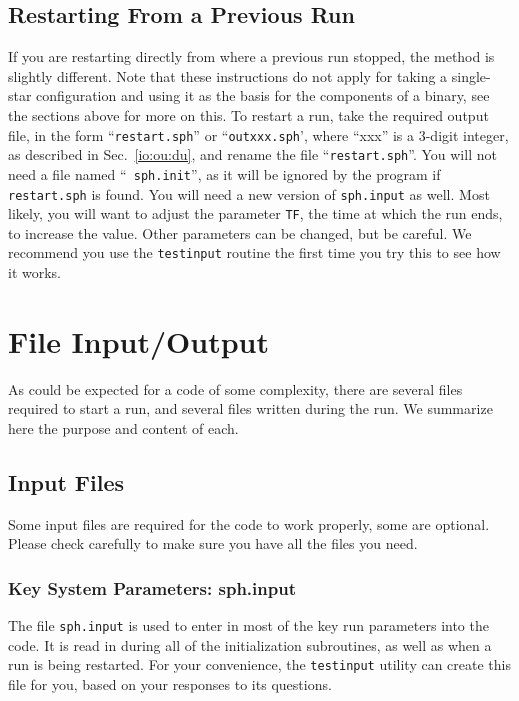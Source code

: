 \subsection{Restarting From a Previous Run}\label{in:re}
If you are restarting directly from where a previous run stopped, the
method is slightly different.  Note that these instructions do not
apply for taking a single-star configuration and using it as the basis
for the components of a binary, see the sections above for more on
this.  To restart a run, take the required output file, in the form
``{\tt restart.sph}'' or ``{\tt outxxx.sph}', where ``xxx'' is a
3-digit integer, as described in Sec.~\ref{io:ou:du}, and rename the
file ``{\tt restart.sph}''.  You will not need a file named ``{\tt
sph.init}'', as it will be ignored by the program if {\tt restart.sph}
is found.  You will need a new version of {\tt sph.input} as well.
Most likely, you will want to adjust the parameter {\tt TF}, the time
at which the run ends, to increase the value.  Other parameters can be
changed, but be careful.  We recommend you use the {\tt testinput}
routine the first time you try this to see how it works. 

\newpage
\section{File Input/Output}
\label{io}
As could be expected for a code of some complexity, there are several
files required to start a run, and several files written during the
run.  We summarize here the purpose and content of each.

\subsection{Input Files}
\label{io:in}
Some input files are required for the code to work properly, some are
optional.  Please check carefully to make sure you have all the files
you need.

\subsubsection{Key System Parameters: sph.input}\label{io:in:input}
The file {\tt sph.input} is used to enter in most of the key run
parameters into the code.  It is read in during all of the
initialization subroutines, as well as when a run is being restarted.
For your convenience, the {\tt testinput} utility can create this file
for you, based on your responses to its questions.

